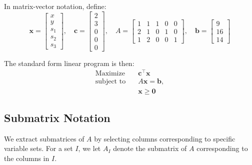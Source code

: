 \begin{tcolorbox}[colback=gray!5!white, colframe=gray!75!black,    
    width=0.8\textwidth, %
    box align=center, 
    title=\textbf{Matrix-Vector Standard Form}]
\noindent In matrix-vector notation, define:
\[
\mathbf{x} = 
\begin{bmatrix}
x \\
y \\
s_1 \\
s_2 \\
s_3
\end{bmatrix},
\quad
\mathbf{c} =
\begin{bmatrix}
2 \\
3 \\
0 \\
0 \\
0
\end{bmatrix},
\quad
A =
\begin{bmatrix}
1 & 1 & 1 & 0 & 0 \\
2 & 1 & 0 & 1 & 0 \\
1 & 2 & 0 & 0 & 1
\end{bmatrix},
\quad
\mathbf{b} =
\begin{bmatrix}
9 \\
16 \\
14
\end{bmatrix}
\]

\bigskip

\noindent The standard form linear program is then:
\[
\begin{aligned}
\text{Maximize} \quad & \mathbf{c}^\top \mathbf{x} \\
\text{subject to} \quad & A\mathbf{x} = \mathbf{b}, \\
& \mathbf{x} \geq \mathbf{0}
\end{aligned}
\]

\end{tcolorbox}

\subsection*{Submatrix Notation}
We extract submatrices of \( A \) by selecting columns corresponding to specific variable sets.  
For a set \( I \), we let \( A_I \) denote the submatrix of \( A \) corresponding to the columns in \( I \).

\bigskip

